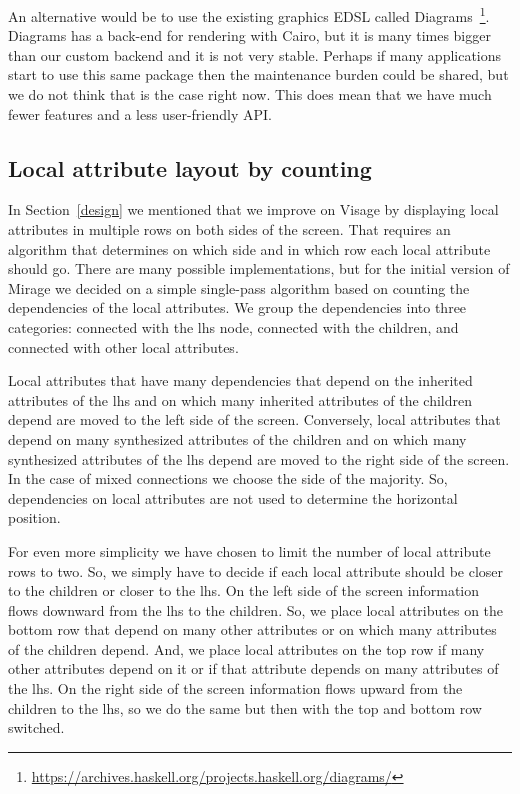 \documentclass[11pt]{article}
\begin{document}
An alternative would be to use the existing graphics EDSL called Diagrams~\footnote{\url{https://archives.haskell.org/projects.haskell.org/diagrams/}}.
Diagrams has a back-end for rendering with Cairo, but it is many times bigger than our custom backend and it is not very stable.
Perhaps if many applications start to use this same package then the maintenance burden could be shared, but we do not think that is the case right now.
This does mean that we have much fewer features and a less user-friendly API.

\subsection{Local attribute layout by counting}

In Section~\ref{design} we mentioned that we improve on Visage by displaying local attributes in multiple rows on both sides of the screen.
That requires an algorithm that determines on which side and in which row each local attribute should go.
There are many possible implementations, but for the initial version of Mirage we decided on a simple single-pass algorithm based on counting the dependencies of the local attributes.
We group the dependencies into three categories: connected with the lhs node, connected with the children, and connected with other local attributes.

Local attributes that have many dependencies that depend on the inherited attributes of the lhs and on which many inherited attributes of the children depend are moved to the left side of the screen.
Conversely, local attributes that depend on many synthesized attributes of the children and on which many synthesized attributes of the lhs depend are moved to the right side of the screen.
In the case of mixed connections we choose the side of the majority.
So, dependencies on local attributes are not used to determine the horizontal position. 

For even more simplicity we have chosen to limit the number of local attribute rows to two.
So, we simply have to decide if each local attribute should be closer to the children or closer to the lhs.
On the left side of the screen information flows downward from the lhs to the children.
So, we place local attributes on the bottom row that depend on many other attributes or on which many attributes of the children depend.
And, we place local attributes on the top row if many other attributes depend on it or if that attribute depends on many attributes of the lhs.
On the right side of the screen information flows upward from the children to the lhs, so we do the same but then with the top and bottom row switched.
\end{document}

